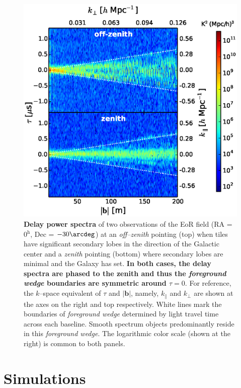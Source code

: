 \documentclass[preprint2,iop,numberedappendix]{emulateapj}
\begin{document}
\begin{figure}[htb]
\centering
\includegraphics[width=\linewidth]{fig3.eps}
\caption{{\bf Delay power spectra} of two observations of the EoR field (RA = 0$^\textrm{h}$, Dec = $-30\arcdeg$) at an {\it off--zenith} pointing (top) when tiles have significant secondary lobes in the direction of the Galactic center and a {\it zenith} pointing (bottom) where secondary lobes are minimal and the Galaxy has set. {\bf In both cases, the delay spectra are phased to the zenith and thus the {\it foreground wedge} boundaries are symmetric around $\tau=0$}. For reference, the $k$--space equivalent of $\tau$ and $|\boldsymbol{b}|$, namely, $k_\parallel$ and $k_\perp$ are shown at the axes on the right and top respectively. White lines mark the boundaries of {\it foreground wedge} determined by light travel time across each baseline. Smooth spectrum objects predominantly reside in this {\it foreground wedge}. The logarithmic color scale (shown at the right) is common to both panels. \label{fig:fhd_data}}
\end{figure}

\section{Simulations}\label{sec:modeling}
\end{document}
